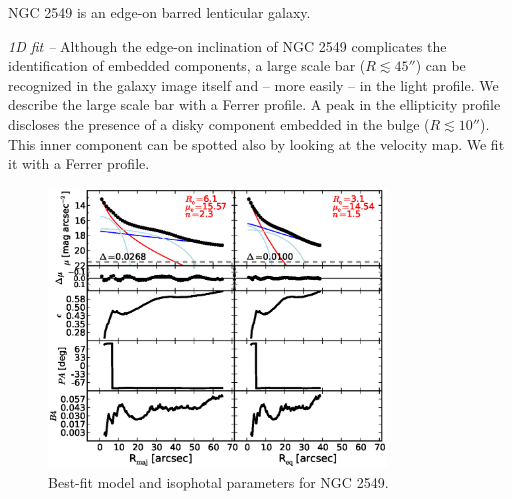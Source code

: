 \documentclass[preprint2]{emulateapj}
\newcommand{\fitfigurewidth}{0.8\textwidth}
\begin{document}
  NGC 2549 is an edge-on barred lenticular galaxy. 


  \emph{1D fit -- }
  Although the edge-on inclination of NGC 2549 complicates the identification of embedded components, 
  a large scale bar ($R \lesssim 45''$) can be recognized in the galaxy image itself and -- more easily -- in the light profile.
  We describe the large scale bar with a Ferrer profile.
  A peak in the ellipticity profile discloses the presence of a disky component
  embedded in the bulge ($R \lesssim 10''$).
  This inner component can be spotted also by looking at the velocity map.
  We fit it with a Ferrer profile.

  \begin{figure}[h]
  \begin{center}
  \includegraphics[width=\fitfigurewidth]{images/n2549_1Dfit.eps}
  \caption{Best-fit model and isophotal parameters for NGC 2549.}
  \end{center}
  \end{figure}
\end{document}
